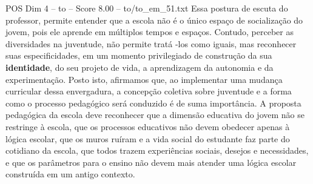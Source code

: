 \begin{textsample}{POS Dim 4 – to – Score 8.00 – to/to\_em\_51.txt}
Essa postura de escuta do professor, permite entender que a escola não é o único espaço de socialização do jovem, pois ele aprende em múltiplos tempos e espaços.
Contudo, perceber as diversidades na juventude, não permite tratá -los como iguais, mas reconhecer suas especificidades, em um momento privilegiado de construção da sua \textbf{identidade}, do seu projeto de vida, a aprendizagem da autonomia e da experimentação.
Posto isto, afirmamos que, ao implementar uma mudança curricular dessa envergadura, a concepção coletiva sobre juventude e a forma como o processo pedagógico será conduzido é de suma importância.
A proposta pedagógica da escola deve reconhecer que a dimensão educativa do jovem não se restringe à escola, que os processos educativos não devem obedecer apenas à lógica escolar, que os muros ruíram e a vida social do estudante faz parte do cotidiano da escola, que todos trazem experiências sociais, desejos e necessidades, e que os parâmetros para o ensino não devem mais atender uma lógica escolar construída em um antigo contexto.

\end{textsample}
